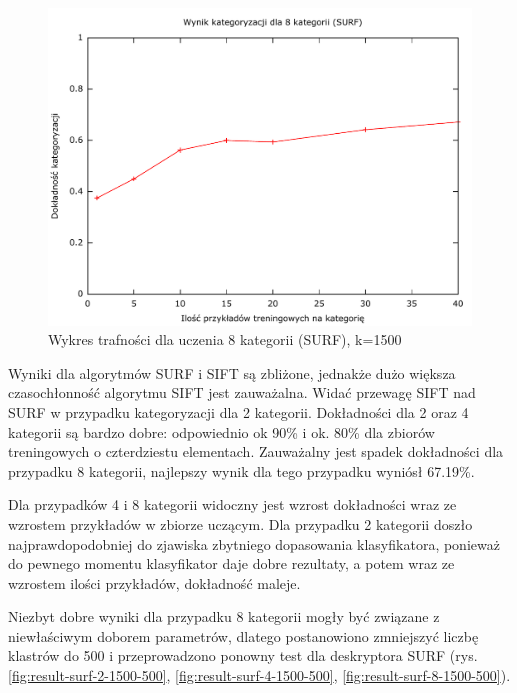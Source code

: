 \begin{figure}[h]
	\centering
	\includegraphics[scale=0.8]{graphics/04_interpretacja_wynikow/result-surf-8.pdf}
	\caption{ Wykres trafności dla uczenia 8 kategorii (SURF), k=1500 }
	\label{fig:result-surf-8}
\end{figure}

Wyniki dla algorytmów SURF i SIFT są zbliżone, jednakże dużo większa czasochłonność algorytmu SIFT jest zauważalna. Widać przewagę SIFT nad SURF w przypadku kategoryzacji dla 2 kategorii. Dokładności dla 2 oraz 4 kategorii są bardzo dobre: odpowiednio ok 90\% i ok. 80\% dla zbiorów treningowych o czterdziestu elementach. Zauważalny jest spadek dokładności dla przypadku 8 kategorii, najlepszy wynik dla tego przypadku wyniósł 67.19\%. 

Dla przypadków 4 i 8 kategorii widoczny jest wzrost dokładności wraz ze wzrostem przykładów w zbiorze uczącym. Dla przypadku 2 kategorii doszło najprawdopodobniej do zjawiska zbytniego dopasowania klasyfikatora, ponieważ do pewnego momentu klasyfikator daje dobre rezultaty, a potem wraz ze wzrostem ilości przykładów, dokładność maleje.

Niezbyt dobre wyniki dla przypadku 8 kategorii mogły być związane z niewłaściwym doborem parametrów, dlatego postanowiono zmniejszyć liczbę klastrów do 500 i przeprowadzono ponowny test dla deskryptora SURF (rys. \ref{fig:result-surf-2-1500-500}, \ref{fig:result-surf-4-1500-500}, \ref{fig:result-surf-8-1500-500}).

